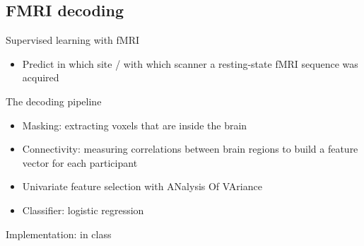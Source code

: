 \documentclass[presentation,mathserif,table]{beamer}
\begin{document}
\subsection{FMRI decoding}
\label{sec:orgd978e45}
\begin{frame}[label={sec:orge1a13d3}]{Supervised learning with fMRI}
\begin{itemize}
\item Predict in which site / with which scanner a resting-state fMRI sequence was acquired
\end{itemize}
\end{frame}
\begin{frame}[label={sec:org87f32a1}]{The decoding pipeline}
\begin{itemize}
\item Masking: extracting voxels that are inside the brain
\item Connectivity: measuring correlations between brain regions to build a feature vector for each participant
\item Univariate feature selection with ANalysis Of VAriance
\item Classifier: logistic regression
\end{itemize}
\end{frame}
\begin{frame}[label={sec:org83afe70}]{Implementation: in class}
\end{frame}
\end{document}
